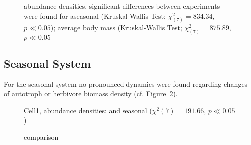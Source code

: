 \begin{figure}
\centering

\caption[Average body mass (aseasonal system)]{abundance densities, significant differences between experiments were found for aseasonal (Kruskal-Wallis Test; $\chi^{2}_{(7)} = 834.34$, $p \ll 0.05$); average body mass (Kruskal-Wallis Test; $\chi^{2}_{(7)} = 875.89$, $p \ll 0.05$}
\label{fig:chap:res:dyn:cell0}
\end{figure}




%


\subsection{Seasonal System}
\label{chap:res:popind:cell1}
 For the seasonal system no pronounced dynamics were found regarding changes of autotroph or herbivore biomass density (cf. Figure~\ref{fig:chap:res:dyn:cell1}).

\begin{figure}
\centering

\caption{Cell1, abundance densities: and seasonal ($\chi^{2}(7) = 191.66$, $p \ll 0.05$)}
\label{fig:chap:res:dyn:cell1}
\end{figure}




%


\begin{figure}
\centering

\caption[Comparison to empirical data]{comparison}
\label{fig:chap:res:dyn:compherb}
\end{figure}



%